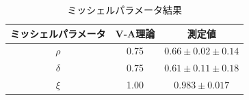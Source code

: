 \begin{table}[bht]
  \centering
  \caption{ミッシェルパラメータ結果}
  \begin{tabular}{ccc}
    \hline
    ミッシェルパラメータ & V-A理論 & 測定値 \\ \hline
    $\rho$   & 0.75 & $0.66\pm0.02\pm0.14$ \\
    $\delta$ & 0.75 & $0.61\pm0.11\pm0.18$ \\
    $\xi$    & 1.00 & $0.983\pm0.017$\\
    \hline
  \end{tabular}
  \label{hatano_tab:michel}
\end{table}


%
